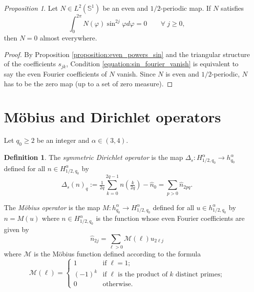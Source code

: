 \documentclass[12pt, openany]{amsart}
\theoremstyle{definition}
\newtheorem{definition}[theorem]{Definition}
\theoremstyle{remark}
\theoremstyle{remark}
\theoremstyle{theorem}
\theoremstyle{theorem}
\theoremstyle{theorem}
\newtheorem{proposition}[theorem]{Proposition}
\theoremstyle{theorem}
\renewcommand{\SS}{\mathbb{S}}
\begin{document}
\medskip

\begin{proposition}
\label{proposition:sin_fourier_vanish}
Let $N\in L^2(\SS^1)$ be an even and $1/2$-periodic map.  If $N$ satisfies
\begin{equation}
\label{equation:sin_fourier_vanish}
 \int_0^{2\pi}N(\varphi) \sin^{2j}\varphi d\varphi = 0 \qquad \forall\; j\geq 0,
\end{equation}
then $N=0$ almost everywhere.
\end{proposition}



\begin{proof}
By Proposition \ref{proposition:even_powers_sin} and the triangular structure of the coefficients $s_{jk}$, Condition \eqref{equation:sin_fourier_vanish} is equivalent to say the even Fourier coefficients of $N$ vanish. Since $N$ is even and $1/2$-periodic, $N$ has to be the zero map (up to a set of zero measure).
\end{proof}

\section{Möbius and Dirichlet operators}
\label{section:mobius_operator}

Let $q_0\geq 2$ be an integer and $\alpha\in(3,4)$.

\begin{definition}
\label{definition:dirichlet_mobius}
The \textit{symmetric Dirichlet operator} is the map $\Delta_s:H^{\alpha}_{1/2,q_0}\to h^{\alpha}_{q_0}$ defined for all $n\in H^{\alpha}_{1/2,q_0}$ by
\[
\Delta_s(n)_q := \tfrac{1}{2q}\sum_{k=0}^{2q-1}n\left(\tfrac{k}{2q}\right)-\widehat n_0
= \sum_{p>0}\widehat n_{2p q}.
\]

The \textit{Möbius operator} is the map $M:h^{\alpha}_{q_0}\to H^{\alpha}_{1/2,q_0}$ defined for all $u\in h^{\alpha}_{1/2,q_0}$ by $n=M(u)$ where $n\in H^{\alpha}_{1/2,q_0}$ is the function whose even Fourier coefficients are given by
\[
\widehat n_{2j} = \sum_{\ell>0}\mathscr M(\ell)u_{2\ell j}
\]
where $\mathscr M$ is the Möbius function defined according to the formula
\[
\mathscr M(\ell) = \left\{
\begin{array}{cl}
1 & \text{if } \ell=1;\\
(-1)^k & \text{if } \ell \text{ is the product of }k\text{ distinct primes;}\\
0 & \text{otherwise.}
\end{array}
\right.
\]


\end{definition}
\end{document}

